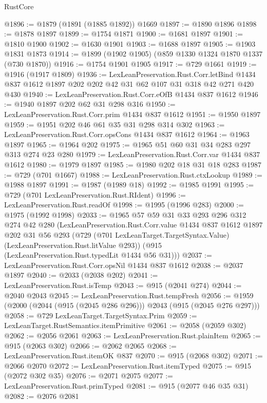 \begin{lexlean}{RustCore}
\begin{coremodule}
@1896 := @1879 (@1891 (@1885 @1892)) @1669
@1897 := @1890 @1896
@1898 := @1878 @1897
@1899 := @1754 @1871
@1900 := @1681 @1897
@1901 := @1810 @1900
@1902 := @1630 @1901
@1903 := @1688 @1897
@1905 := @1903 @1831 @1873
@1914 := @1899 (@1902 @1905) (@859 @1330 @1324 @1870 @1337 (@730 @1870))
@1916 := @1754 @1901 @1905
@1917 := @729 @1661
@1919 := @1916 (@1917 @1809)
@1936 := LexLeanPreservation.Rust.Corr.letBind
    @1434
    @837
    @1612
    @1897
    @202
    @202
    @42
    @31
    @62
    @107
    @31
    @318
    @42
    @271
    @420
    @430
@1940 := LexLeanPreservation.Rust.Corr.eOfB @1434 @837 @1612
@1946 := @1940 @1897 @202 @62 @31 @298 @316
@1950 := LexLeanPreservation.Rust.Corr.prim @1434 @837 @1612
@1951 := @1950 @1897
@1959 := @1951 @202 @46 @61 @35 @31 @298 @314 @302
@1963 := LexLeanPreservation.Rust.Corr.opsCons @1434 @837 @1612
@1964 := @1963 @1897
@1965 := @1964 @202
@1975 := @1965 @51 @60 @31 @34 @283 @297 @313 @274 @23 @280
@1979 := LexLeanPreservation.Rust.Corr.var @1434 @837 @1612
@1980 := @1979 @1897
@1985 := @1980 @202 @18 @31 @18 @283
@1987 := @729 (@701 @1667)
@1988 := LexLeanPreservation.Rust.ctxLookup
@1989 := @1988 @1897
@1991 := @1987 (@1989 @18)
@1992 := @1985 @1991
@1995 := @729 (@701 LexLeanPreservation.Rust.RIdent)
@1996 := LexLeanPreservation.Rust.readOf
@1998 := @1995 (@1996 @283)
@2000 := @1975 (@1992 @1998)
@2033 := @1965
    @57
    @59
    @31
    @33
    @293
    @296
    @312
    @274
    @42
    @280
    (LexLeanPreservation.Rust.Corr.value
      @1434
      @837
      @1612
      @1897
      @202
      @31
      @56
      @293
      (@729 (@701 LexLeanTarget.TargetSyntax.Value) (LexLeanPreservation.Rust.litValue @293))
      (@915 (LexLeanPreservation.Rust.typedLit @1434 @56 @31)))
@2037 := LexLeanPreservation.Rust.Corr.opsNil @1434 @837 @1612
@2038 := @2037 @1897
@2040 := @2033 (@2038 @202)
@2041 := LexLeanPreservation.Rust.isTemp
@2043 := @915 (@2041 @274)
@2044 := @2040 @2043
@2045 := LexLeanPreservation.Rust.tempFresh
@2056 := @1959 (@2000 (@2044 (@915 (@2045 @286 @296))) @2043 (@915 (@2045 @276 @297)))
@2058 := @729 LexLeanTarget.TargetSyntax.Prim
@2059 := LexLeanTarget.RustSemantics.itemPrimitive
@2061 := @2058 (@2059 @302)
@2062 := @2056 @2061
@2063 := LexLeanPreservation.Rust.plainItem
@2065 := @915 (@2063 @302)
@2066 := @2062 @2065
@2068 := LexLeanPreservation.Rust.itemOK @837
@2070 := @915 (@2068 @302)
@2071 := @2066 @2070
@2072 := LexLeanPreservation.Rust.itemTyped
@2075 := @915 (@2072 @302 @35)
@2076 := @2071 @2075
@2077 := LexLeanPreservation.Rust.primTyped
@2081 := @915 (@2077 @46 @35 @31)
@2082 := @2076 @2081

\end{coremodule}
\end{lexlean}
